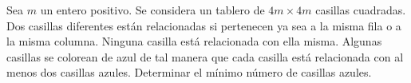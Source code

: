 Sea $m$ un entero positivo. Se considera un tablero de $4m \times 4m$ casillas cuadradas.
Dos casillas diferentes están relacionadas si pertenecen ya sea a la misma fila o a la misma columna.
Ninguna casilla está relacionada con ella misma. Algunas casillas se colorean de azul de tal manera
que cada casilla está relacionada con al menos dos casillas azules. Determinar el mínimo número de
casillas azules.